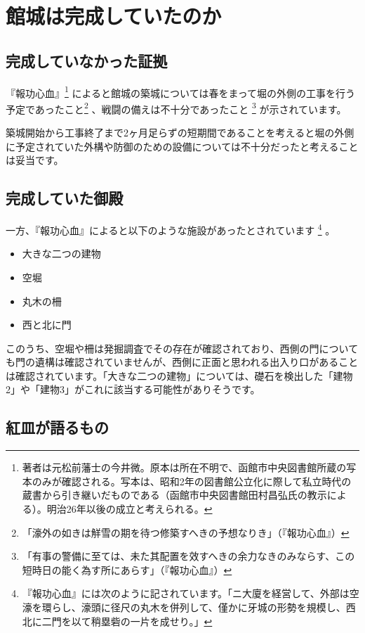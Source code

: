 \documentclass[11pt,report]{jsbook}
\begin{document}
\chapter{館城は完成していたのか}
\section{完成していなかった証拠}
『報功心血』\footnote{
著者は元松前藩士の今井微。原本は所在不明で、函館市中央図書館所蔵の写本のみが確認される。写本は、昭和2年の図書館公立化に際して私立時代の蔵書から引き継いだものである（函館市中央図書館田村昌弘氏の教示による）。明治26年以後の成立と考えられる。
}
によると館城の築城については春をまって堀の外側の工事を行う予定であったこと\footnote{
「濠外の如きは觧雪の期を待つ修築すへきの予想なりき」（『報功心血』）
}
、戦闘の備えは不十分であったこと
\footnote{
「有事の警備に至ては、未た其配置を效すへきの余力なきのみならす、この短時日の能く為す所にあらす」（『報功心血』）
}
が示されています。

築城開始から工事終了まで2ヶ月足らずの短期間であることを考えると堀の外側に予定されていた外構や防御のための設備については不十分だったと考えることは妥当です。

\section{完成していた御殿}
一方、『報功心血』によると以下のような施設があったとされています
\footnote{
『報功心血』には次のように記されています。「ニ大廈を経営して、外部は空濠を環らし、濠頭に径尺の丸木を併列して、僅かに牙城の形勢を規模し、西北に二門を以て稍塁砦の一片を成せり。」
}
。

\begin{itemize}
\item 大きな二つの建物
\item 空堀
\item 丸木の柵
\item 西と北に門
\end{itemize}

このうち、空堀や柵は発掘調査でその存在が確認されており、西側の門についても門の遺構は確認されていませんが、西側に正面と思われる出入り口があることは確認されています。「大きな二つの建物」については、礎石を検出した「建物2」や「建物3」がこれに該当する可能性がありそうです。

\section{紅皿が語るもの}
\end{document}
